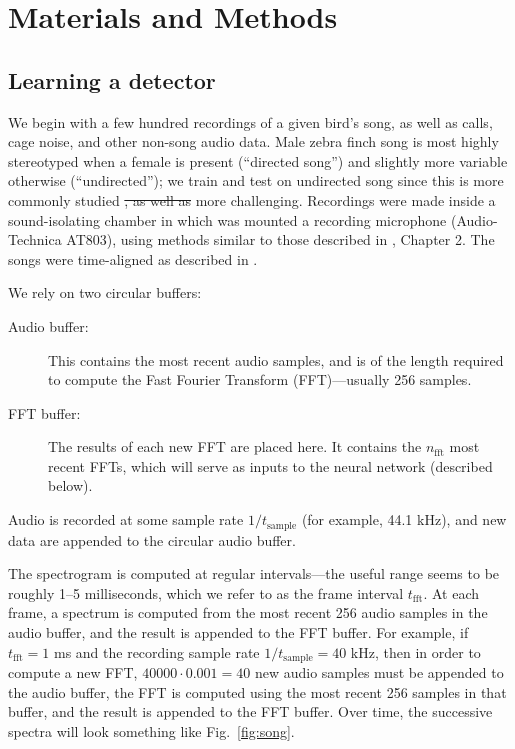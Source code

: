 \documentclass[10pt,letterpaper]{article}
\newcommand\fig[1]{Fig.~\ref{#1}}
\providecommand{\DIFaddtex}[1]{{\protect\color{blue}\uwave{#1}}} %
\providecommand{\DIFdeltex}[1]{{\protect\color{red}\sout{#1}}}                      %
\providecommand{\DIFaddbegin}{} %
\providecommand{\DIFaddend}{} %
\providecommand{\DIFdelbegin}{} %
\providecommand{\DIFdelend}{} %
\providecommand{\DIFadd}[1]{\texorpdfstring{\DIFaddtex{#1}}{#1}} %
\providecommand{\DIFdel}[1]{\texorpdfstring{\DIFdeltex{#1}}{}} %
\newcommand{\DIFscaledelfig}{0.5}
\newlength{\DIFdelgraphicswidth} %
\newlength{\DIFdelgraphicsheight} %
\newcommand{\DIFaddincludegraphics}[2][]{{\color{blue}\fbox{\DIFOincludegraphics[#1]{#2}}}} %
\newcommand{\DIFdelincludegraphics}[2][]{%
\sbox{\DIFdelgraphicsbox}{\DIFOincludegraphics[#1]{#2}}%
\settoboxwidth{\DIFdelgraphicswidth}{\DIFdelgraphicsbox} %
\settoboxtotalheight{\DIFdelgraphicsheight}{\DIFdelgraphicsbox} %
\scalebox{\DIFscaledelfig}{%
\parbox[b]{\DIFdelgraphicswidth}{\usebox{\DIFdelgraphicsbox}\\[-\baselineskip] \rule{\DIFdelgraphicswidth}{0em}}\llap{\resizebox{\DIFdelgraphicswidth}{\DIFdelgraphicsheight}{%
\setlength{\unitlength}{\DIFdelgraphicswidth}%
\begin{picture}(1,1)%
\thicklines\linethickness{2pt} %
{\color[rgb]{1,0,0}\put(0,0){\framebox(1,1){}}}%
{\color[rgb]{1,0,0}\put(0,0){\line( 1,1){1}}}%
{\color[rgb]{1,0,0}\put(0,1){\line(1,-1){1}}}%
\end{picture}%
}\hspace*{3pt}}} %
} %
\DeclareRobustCommand{\DIFaddbegin}{\DIFOaddbegin \let\includegraphics\DIFaddincludegraphics} %
\DeclareRobustCommand{\DIFaddend}{\DIFOaddend \let\includegraphics\DIFOincludegraphics} %
\DeclareRobustCommand{\DIFdelbegin}{\DIFOdelbegin \let\includegraphics\DIFdelincludegraphics} %
\DeclareRobustCommand{\DIFdelend}{\DIFOaddend \let\includegraphics\DIFOincludegraphics} %
\begin{document}
\section{Materials and Methods}
\label{sec:method}


\subsection{Learning a detector}

We begin with a few hundred recordings of a given bird's song, as well
as calls, cage noise, and other non-song audio data.  Male zebra finch
song is most highly stereotyped when a female is present (``directed
song'') and slightly more variable otherwise (``undirected''); we
train and test on undirected song since this is \DIFaddbegin \DIFadd{both }\DIFaddend more commonly
studied \DIFdelbegin \DIFdel{,
as well as }\DIFdelend \DIFaddbegin \DIFadd{and }\DIFaddend more challenging.  Recordings were made inside a
sound-isolating chamber in which was mounted a recording microphone
(Audio-Technica AT803), using methods similar to those described in
\cite{Tchernichovski2011SAP}, Chapter 2.  The songs were time-aligned
as described in \cite{Poole2012}.

We rely on two circular buffers:
\begin{description}
\item[Audio buffer:] This contains the most recent audio samples, and
  is of the length required to compute the Fast Fourier Transform
  (FFT)---usually 256 samples.
\item[FFT buffer:] The results of each new FFT are placed here.  It
  contains the $n_\textrm{fft}$ most recent FFTs, which will serve as
  inputs to the neural network (described below).
\end{description}

Audio is recorded at some sample rate $1/t_\mathrm{sample}$ (for example, 44.1 kHz), and new data are appended to the circular audio buffer.

The spectrogram is computed at regular intervals---the useful range
seems to be roughly 1--5 milliseconds, which we refer to as the frame
interval $t_\textrm{fft}$.  At each frame, a spectrum is computed from
the most recent 256 audio samples in the audio buffer, and the result
is appended to the FFT buffer.  For example, if $t_\textrm{fft}=1$ ms
and the recording sample rate $1/t_\textrm{sample}=40$ kHz, then in
order to compute a new FFT, $40000\cdot 0.001=40$ new audio samples
must be appended to the audio buffer, the FFT is computed using the
most recent 256 samples in that buffer, and the result is appended to
the FFT buffer.  Over time, the successive spectra will look something
like \fig{fig:song}.
\end{document}
